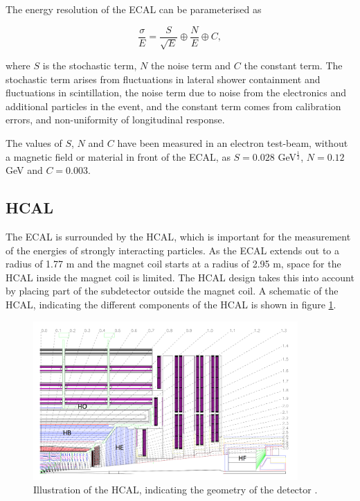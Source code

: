 The energy resolution of the \ac{ECAL} can be parameterised as

\begin{equation}\label{eqn:ecalres}
\frac{\sigma}{E} = \frac{S}{\sqrt{E}}\oplus\frac{N}{E}\oplus C,
\end{equation}

where $S$ is the stochastic term, $N$ the noise term and $C$ the constant term.
The stochastic term arises from fluctuations in lateral shower containment and 
fluctuations in scintillation, the noise term due to noise from the electronics
and additional particles in the event, and the constant term comes
from calibration errors, and non-uniformity of longitudinal response.

The values of $S$, $N$ and $C$ have been measured in an electron
test-beam, without a magnetic field or material in front of the \ac{ECAL}, as 
$S = 0.028$ GeV$^{\frac{1}{2}}$, $N = 0.12$ GeV and $C= 0.003$.



\subsection{\acl{HCAL}}
\label{sec:CMSLHC_CMS_hcal}
The \ac{ECAL} is surrounded by the \ac{HCAL}, which is important for the
measurement of the energies of strongly interacting particles. As
the \ac{ECAL} extends out to a radius of 1.77 m and the magnet coil
starts at a radius of 2.95 m, space for the \ac{HCAL} inside the magnet
coil is limited. The \ac{HCAL} design takes
this into account by placing part of the subdetector outside the magnet coil. A schematic of the
\ac{HCAL}, indicating the different components of the \ac{HCAL} is shown
in figure \ref{fig:CMS_HCAL}.

\begin{figure}[h!]
\begin{center}
\includegraphics[width=0.9\textwidth]{./Detector/Plots/HCAL.png}
\caption{Illustration of the \ac{HCAL}, indicating the geometry
of the detector \cite{cms-jinst}.}
\label{fig:CMS_HCAL}
\end{center}
\end{figure}


